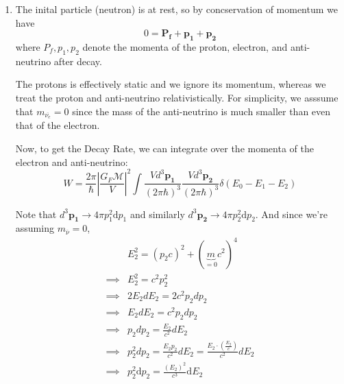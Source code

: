 \documentclass{article}
\begin{document}
\begin{enumerate}[label=(\alph*)]
  \item The inital particle (neutron) is at rest, so by concservation of momentum we have 
  \[ 0 = \mathbf{P_f} + \mathbf{p_1} + \mathbf{p_2}  \]
  where $P_f, p_1, p_2$ denote the momenta of the proton, electron, and anti-neutrino after decay.

  \vskip 0.5cm
  The protons is effectively static and we ignore its momentum, whereas we treat the proton and anti-neutrino relativistically. For simplicity, we asssume that $m_{\overline{\nu_{e}}} = 0$ since the mass of the anti-neutrino is much smaller than even that of the electron.

  \vskip 0.5cm
  Now, to get the Decay Rate, we can integrate over the momenta of the electron and anti-neutrino:
  \[ W = \frac{2\pi}{\hbar} \left|\frac{G_F \mathcal{M}}{V}\right|^2 \int \frac{V d^3 \mathbf{p_1}}{(2\pi \hbar)^3} \frac{V d^3 \mathbf{p_2}}{(2\pi \hbar)^3} \delta\left(E_0 - E_1 - E_2\right)  \]


  Note that $d^3 \mathbf{p_1} \rightarrow 4\pi p_1^2 \mathrm{d}p_1$ and similarly $d^3 \mathbf{p_2} \rightarrow 4\pi p_2^2 \mathrm{d} p_2$. And since we're assuming $m_{\overline{\nu}} = 0$, 
  \begin{align*}
    &E_2^2 = (p_2 c)^2 + (\underbrace{m}_{=0} c^2)^4 \\
    \implies& E_2^2 = c^2p_2^2 \\
    \implies& 2E_2 dE_2 = 2c^2p_2 dp_2 \\
    \implies& E_2 dE_2 = c^2 p_2 dp_2 \\
    \implies& p_2 dp_2 = \frac{E_2}{c^2} dE_2 \\
    \implies& p_2^2 dp_2 = \frac{E_2 p_2}{c^2} dE_2 = \frac{E_2 \cdot \left( \frac{E_2}{c} \right)}{c^2} dE_2 \\
    \implies& p_2^2 \mathrm{d}p_2 = \frac{(E_2)^2}{c^3} \mathrm{d} E_2
  \end{align*}


\end{enumerate}
\end{document}
